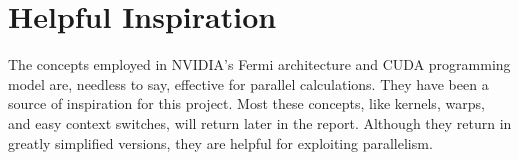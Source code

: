 \documentclass[../main/report.tex]{subfiles}
\begin{document}
\section{Helpful Inspiration}

The concepts employed in NVIDIA's Fermi architecture and CUDA programming model are, needless to say, effective for parallel calculations.
They have been a source of inspiration for this project.
Most these concepts, like kernels, warps, and easy context switches, will return later in the report.
Although they return in greatly simplified versions, they are helpful for exploiting parallelism.
\end{document}
